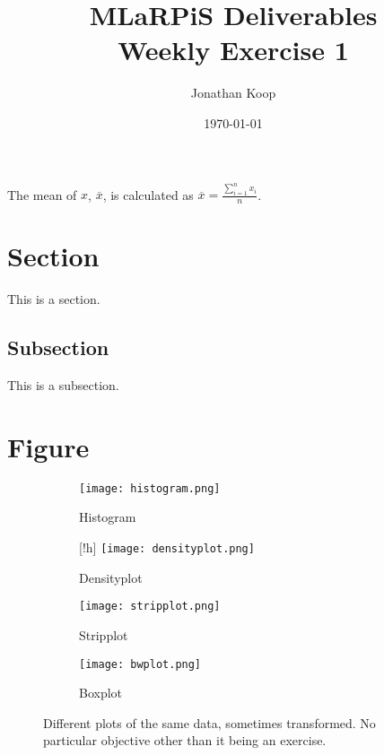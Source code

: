\documentclass[10pt, a4paper, titlepage]{article}
\title{MLaRPiS Deliverables\\ \small Weekly Exercise 1}
\author{Jonathan Koop}
\date{\today}
\begin{document}
\maketitle
\newpage

The mean of $x$, $\overline{x}$, is calculated as $\overline{x}= \frac{\sum_{i=1}^{n} x_i}{n}$.

\section{Section}
This is a section.

\subsection{Subsection}
This is a subsection.

\section{Figure}


\begin{figure}[htbp]
    \centering
    \begin{subfigure}{0.45\textwidth}
        \centering
        \texttt{[image: histogram.png]}
        \caption{Histogram}
        \label{fig:sub1}
    \end{subfigure}
    \hfill
    \begin{subfigure}{0.45\textwidth}[!h]
        \centering
        \texttt{[image: densityplot.png]}
        \caption{Densityplot}
        \label{fig:sub2}
    \end{subfigure}
    \vspace{0.5cm}
    \begin{subfigure}{0.45\textwidth}
        \centering
        \texttt{[image: stripplot.png]}
        \caption{Stripplot}
        \label{fig:sub3}
    \end{subfigure}
    \hfill
    \begin{subfigure}{0.45\textwidth}
        \centering
        \texttt{[image: bwplot.png]}
        \caption{Boxplot}
        \label{fig:sub4}
    \end{subfigure}
    
    \caption{Different plots of the same data, sometimes transformed. No particular objective other than it being an exercise.}
    \label{fig:main}
\end{figure}
\end{document}

